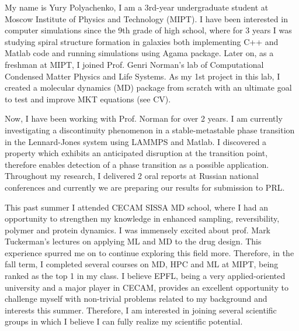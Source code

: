 \documentclass[12pt, a4paper]{awesome-cv}
\begin{document}
\begin{cvletter}


My name is Yury Polyachenko, I am a 3rd-year undergraduate student at Moscow Institute of Physics and Technology (MIPT). I have been interested in computer simulations since the 9th grade of high school, where for 3 years I was studying spiral structure formation in galaxies both implementing C++ and Matlab code and running simulations using Agama package. Later on, as a freshman at MIPT, I joined Prof. Genri Norman’s lab of Computational Condensed Matter Physics and Life Systems. As my 1st project in this lab, I created a molecular dynamics (MD) package from scratch with an ultimate goal to test and improve MKT equations (see CV). 

Now, I have been working with Prof. Norman for over 2 years. I am currently investigating a discontinuity phenomenon in a stable-metastable phase transition in the Lennard-Jones system using LAMMPS and Matlab. I discovered a property which exhibits an anticipated disruption at the transition point, therefore enables detection of a phase transition as a possible application. Throughout my research, I delivered 2 oral reports at Russian national conferences and currently we are preparing our results for submission to PRL.

This past summer I attended CECAM SISSA MD school, where I had an opportunity to strengthen my knowledge in enhanced sampling, reversibility, polymer and protein dynamics. I was immensely excited about prof. Mark Tuckerman's lectures on applying ML and MD to the drug design. This experience spurred me on to continue exploring this field more. Therefore, in the fall term, I completed several courses on MD, HPC and ML at MIPT, being ranked as the top 1 in my class. I believe EPFL, being a very applied-oriented university and a major player in CECAM, provides an excellent opportunity to challenge myself with non-trivial problems related to my background and interests this summer. Therefore, I am interested in joining several scientific groups in which I believe I can fully realize my scientific potential.


\end{cvletter}
\end{document}
